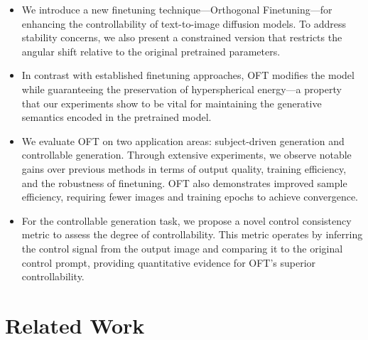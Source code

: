\begin{itemize}[leftmargin=*,nosep]

    \item We introduce a new finetuning technique—Orthogonal Finetuning—for enhancing the controllability of text-to-image diffusion models. To address stability concerns, we also present a constrained version that restricts the angular shift relative to the original pretrained parameters.
    \item In contrast with established finetuning approaches, OFT modifies the model while guaranteeing the preservation of hyperspherical energy—a property that our experiments show to be vital for maintaining the generative semantics encoded in the pretrained model.
    \item We evaluate OFT on two application areas: subject-driven generation and controllable generation. Through extensive experiments, we observe notable gains over previous methods in terms of output quality, training efficiency, and the robustness of finetuning. OFT also demonstrates improved sample efficiency, requiring fewer images and training epochs to achieve convergence.
    \item For the controllable generation task, we propose a novel control consistency metric to assess the degree of controllability. This metric operates by inferring the control signal from the output image and comparing it to the original control prompt, providing quantitative evidence for OFT's superior controllability.
\end{itemize}

\section{Related Work}

